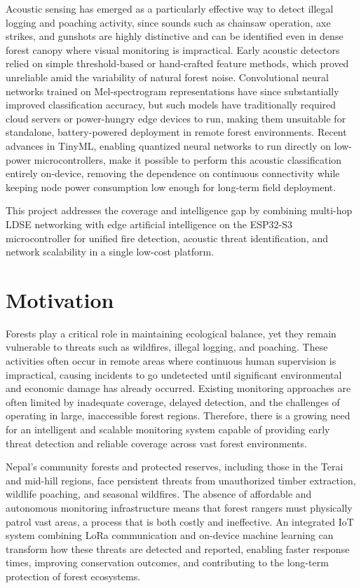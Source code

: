Acoustic sensing has emerged as a particularly effective way to detect illegal
logging and poaching activity, since sounds such as chainsaw operation, axe
strikes, and gunshots are highly distinctive and can be identified even in
dense forest canopy where visual monitoring is impractical. Early acoustic
detectors relied on simple threshold-based or hand-crafted feature methods,
which proved unreliable amid the variability of natural forest noise.
Convolutional neural networks trained on Mel-spectrogram representations have
since substantially improved classification accuracy, but such models have
traditionally required cloud servers or power-hungry edge devices to run,
making them unsuitable for standalone, battery-powered deployment in remote
forest environments. Recent advances in TinyML, enabling quantized neural
networks to run directly on low-power microcontrollers, make it possible to
perform this acoustic classification entirely on-device, removing the
dependence on continuous connectivity while keeping node power consumption
low enough for long-term field deployment.

This project addresses the coverage and intelligence gap by combining multi-hop
LDSE networking with edge artificial intelligence on the ESP32-S3 microcontroller
for unified fire detection, acoustic threat identification, and network scalability
in a single low-cost platform.

\section{Motivation}

Forests play a critical role in maintaining ecological balance, yet they remain
vulnerable to threats such as wildfires, illegal logging, and poaching. These
activities often occur in remote areas where continuous human supervision is
impractical, causing incidents to go undetected until significant environmental and
economic damage has already occurred. Existing monitoring approaches are often
limited by inadequate coverage, delayed detection, and the challenges of operating
in large, inaccessible forest regions. Therefore, there is a growing need for an
intelligent and scalable monitoring system capable of providing early threat
detection and reliable coverage across vast forest environments.

Nepal's community forests and protected reserves, including those in the Terai and
mid-hill regions, face persistent threats from unauthorized timber extraction,
wildlife poaching, and seasonal wildfires. The absence of affordable and autonomous
monitoring infrastructure means that forest rangers must physically patrol vast
areas, a process that is both costly and ineffective. An integrated IoT system
combining LoRa communication and on-device machine learning can transform how these
threats are detected and reported, enabling faster response times, improving
conservation outcomes, and contributing to the long-term protection of forest
ecosystems.

